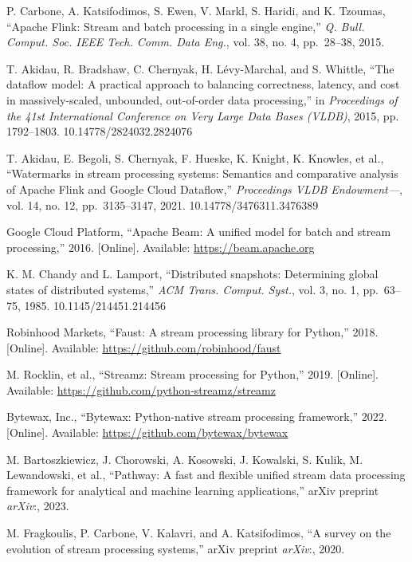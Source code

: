  P. Carbone, A. Katsifodimos, S. Ewen, V. Markl, S. Haridi, and K. Tzoumas, ``Apache Flink: Stream and batch processing in a single engine,'' \emph{Q. Bull. Comput. Soc. IEEE Tech. Comm. Data Eng.}, vol. 38, no. 4, pp.~28--38, 2015.

 T. Akidau, R. Bradshaw, C. Chernyak, H. L\'{e}vy-Marchal, and S. Whittle, ``The dataflow model: A practical approach to balancing correctness, latency, and cost in massively-scaled, unbounded, out-of-order data processing,'' in \emph{Proceedings of the 41st International Conference on Very Large Data Bases (VLDB)}, 2015, pp. 1792--1803. 10.14778/2824032.2824076

 T. Akidau, E. Begoli, S. Chernyak, F. Hueske, K. Knight, K. Knowles, et al., ``Watermarks in stream processing systems: Semantics and comparative analysis of Apache Flink and Google Cloud Dataflow,'' \emph{Proceedings VLDB Endowment---}, vol. 14, no. 12, pp.~3135--3147, 2021. 10.14778/3476311.3476389

 {Google Cloud Platform}, ``Apache Beam: A unified model for batch and stream processing,'' 2016. [Online]. Available: \url{https://beam.apache.org}

 K. M. Chandy and L. Lamport, ``Distributed snapshots: Determining global states of distributed systems,'' \emph{ACM Trans. Comput. Syst.}, vol. 3, no. 1, pp.~63--75, 1985. 10.1145/214451.214456

 {Robinhood Markets}, ``Faust: A stream processing library for Python,'' 2018. [Online]. Available: \url{https://github.com/robinhood/faust}

 M. Rocklin, et al., ``Streamz: Stream processing for Python,'' 2019. [Online]. Available: \url{https://github.com/python-streamz/streamz}

 {Bytewax, Inc.}, ``Bytewax: Python-native stream processing framework,'' 2022. [Online]. Available: \url{https://github.com/bytewax/bytewax}

 M. Bartoszkiewicz, J. Chorowski, A. Kosowski, J. Kowalski, S. Kulik, M. Lewandowski, et al., ``Pathway: A fast and flexible unified stream data processing framework for analytical and machine learning applications,'' arXiv preprint \emph{arXiv}:, 2023.

 M. Fragkoulis, P. Carbone, V. Kalavri, and A. Katsifodimos, ``A survey on the evolution of stream processing systems,'' arXiv preprint \emph{arXiv}:, 2020.


